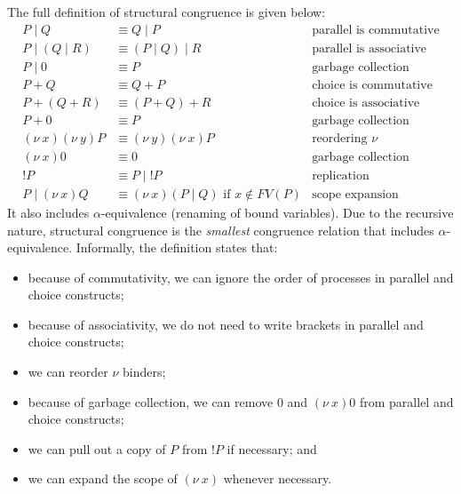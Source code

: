 \documentclass[a4paper, openany]{memoir}
\theoremstyle{definition}
\begin{document}
    The full definition of structural congruence is given below:
    \begin{align*}
        P \mid Q &\equiv Q \mid P & \textrm{parallel is commutative} \\
        P \mid (Q \mid R) &\equiv (P \mid Q) \mid R & \textrm{parallel is associative} \\
        P \mid 0 &\equiv P & \textrm{garbage collection} \\
        P + Q &\equiv Q + P & \textrm{choice is commutative} \\
        P + (Q + R) &\equiv (P + Q) + R & \textrm{choice is associative} \\
        P + 0 &\equiv P & \textrm{garbage collection} \\
        (\nu \ x)(\nu \ y)P &\equiv (\nu \ y)(\nu \ x)P & \textrm{reordering } \nu \\
        (\nu \ x)0 &\equiv 0 & \textrm{garbage collection} \\
        !P &\equiv P \mid {!P} & \textrm{replication} \\
        P \mid (\nu \ x) Q &\equiv (\nu \ x)(P \mid Q) \textrm{ if } x \not\in FV(P) & \textrm{scope expansion}
    \end{align*}
    It also includes $\alpha$-equivalence (renaming of bound variables). Due to the recursive nature, structural congruence is the \emph{smallest} congruence relation that includes $\alpha$-equivalence. Informally, the definition states that:
    \begin{itemize}
        \item because of commutativity, we can ignore the order of processes in parallel and choice constructs;
        \item because of associativity, we do not need to write brackets in parallel and choice constructs;
        \item we can reorder $\nu$ binders;
        \item because of garbage collection, we can remove $0$ and $(\nu \  x) 0$ from parallel and choice constructs;
        \item we can pull out a copy of $P$ from $!P$ if necessary; and
        \item we can expand the scope of $(\nu \ x)$ whenever necessary.
    \end{itemize}
\end{document}
